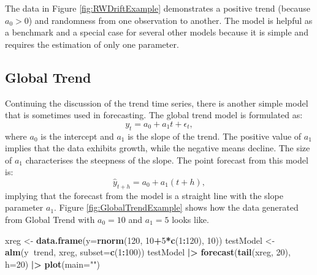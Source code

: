 \documentclass[]{book}
\newenvironment{Shaded}{\begin{snugshade}}{\end{snugshade}}
\newcommand{\DataTypeTok}[1]{\textcolor[rgb]{0.13,0.29,0.53}{#1}}
\newcommand{\DecValTok}[1]{\textcolor[rgb]{0.00,0.00,0.81}{#1}}
\newcommand{\ErrorTok}[1]{\textcolor[rgb]{0.64,0.00,0.00}{\textbf{#1}}}
\newcommand{\KeywordTok}[1]{\textcolor[rgb]{0.13,0.29,0.53}{\textbf{#1}}}
\newcommand{\NormalTok}[1]{#1}
\newcommand{\OperatorTok}[1]{\textcolor[rgb]{0.81,0.36,0.00}{\textbf{#1}}}
\newcommand{\StringTok}[1]{\textcolor[rgb]{0.31,0.60,0.02}{#1}}
\theoremstyle{definition}
\theoremstyle{definition}
\theoremstyle{definition}
\theoremstyle{definition}
\theoremstyle{remark}
\begin{document}
The data in Figure \ref{fig:RWDriftExample} demonstrates a positive trend (because \(a_0>0\)) and randomness from one observation to another. The model is helpful as a benchmark and a special case for several other models because it is simple and requires the estimation of only one parameter.

\hypertarget{GlobalTrend}{%
\subsection{Global Trend}\label{GlobalTrend}}

Continuing the discussion of the trend time series, there is another simple model that is sometimes used in forecasting. The global trend model is formulated as:
\begin{equation}
    y_t = a_0 + a_1 t + \epsilon_t,
    \label{eq:GlobalTrend}
\end{equation}
where \(a_0\) is the intercept and \(a_1\) is the slope of the trend. The positive value of \(a_1\) implies that the data exhibits growth, while the negative means decline. The size of \(a_1\) characterises the steepness of the slope. The point forecast from this model is:
\begin{equation}
    \hat{y}_{t+h} = a_0 + a_1 (t+h),
    \label{eq:GlobalTrendForecast}
\end{equation}
implying that the forecast from the model is a straight line with the slope parameter \(a_1\). Figure \ref{fig:GlobalTrendExample} shows how the data generated from Global Trend with \(a_0=10\) and \(a_1=5\) looks like.

\begin{Shaded}
\begin{Highlighting}[]
\NormalTok{xreg <-}\StringTok{ }\KeywordTok{data.frame}\NormalTok{(}\DataTypeTok{y=}\KeywordTok{rnorm}\NormalTok{(}\DecValTok{120}\NormalTok{, }\DecValTok{10}\OperatorTok{+}\DecValTok{5}\OperatorTok{*}\KeywordTok{c}\NormalTok{(}\DecValTok{1}\OperatorTok{:}\DecValTok{120}\NormalTok{), }\DecValTok{10}\NormalTok{))}
\NormalTok{testModel <-}\StringTok{ }\KeywordTok{alm}\NormalTok{(y}\OperatorTok{~}\NormalTok{trend, xreg, }\DataTypeTok{subset=}\KeywordTok{c}\NormalTok{(}\DecValTok{1}\OperatorTok{:}\DecValTok{100}\NormalTok{))}
\NormalTok{testModel }\OperatorTok{|}\ErrorTok{>}
\StringTok{  }\KeywordTok{forecast}\NormalTok{(}\KeywordTok{tail}\NormalTok{(xreg, }\DecValTok{20}\NormalTok{), }\DataTypeTok{h=}\DecValTok{20}\NormalTok{) }\OperatorTok{|}\ErrorTok{>}
\StringTok{  }\KeywordTok{plot}\NormalTok{(}\DataTypeTok{main=}\StringTok{""}\NormalTok{)}
\end{Highlighting}
\end{Shaded}
\end{document}
